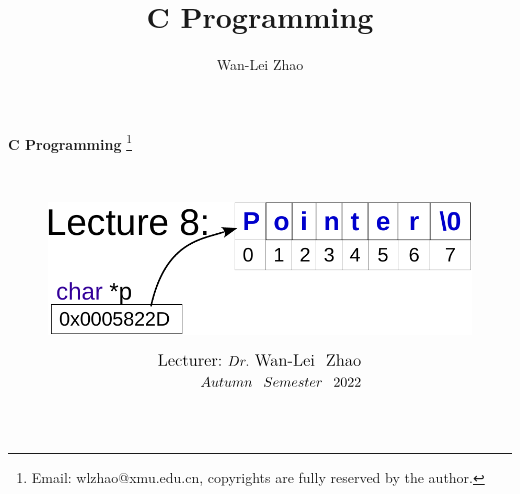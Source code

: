 \documentclass[]{beamer}
\title{C Programming}
\author{Wan-Lei Zhao}
\newcommand\blfootnote[1]{
  \begingroup
  \renewcommand\thefootnote{}\footnote{#1}
  \addtocounter{footnote}{-1}
  \endgroup
}
\begin{document}
\begin{frame}
   \begin{center}
    \vspace{24pt}
    \Huge\textbf{C Programming}\blfootnote{Email: wlzhao@xmu.edu.cn, copyrights are fully reserved by the author.}\\
     \begin{figure}
     	\begin{center}
     		\includegraphics[width=0.5\linewidth]{figs/point_symb.pdf}
     	\end{center}
\end{figure}          
     
\vspace{36pt}
  \end{center}
  \begin{align*}
   \vspace{18pt}
      \large{\mbox{Lecturer:}~Dr.~\mbox{Wan-Lei~~Zhao}} \\
      \large{Autumn~~Semester~~2022}\\
	   \vspace{30pt} \\
  \end{align*}
\end{frame}








\section{}
\end{document}
